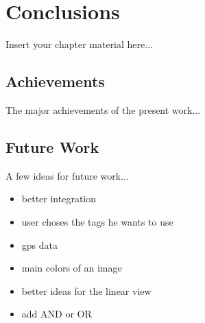 
\chapter{Conclusions}
\label{chapter:conclusions}


Insert your chapter material here...


\section{Achievements}
\label{section:achievements}

The major achievements of the present work...


\section{Future Work}
\label{section:future}

A few ideas for future work...

\begin{itemize}

	\item better integration

	\item user choses the tags he wants to use

	\item gps data

	\item main colors of an image  
	
	\item better ideas for the linear view
	
	\item add AND or OR	

\end{itemize}


\cleardoublepage

